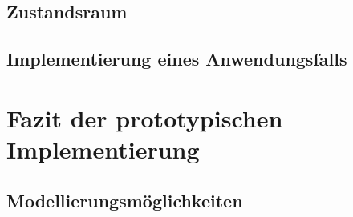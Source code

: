 \subsection{Zustandsraum}

\subsection{Implementierung eines Anwendungsfalls}


\section{Fazit der prototypischen Implementierung}
\subsection{Modellierungsmöglichkeiten}

